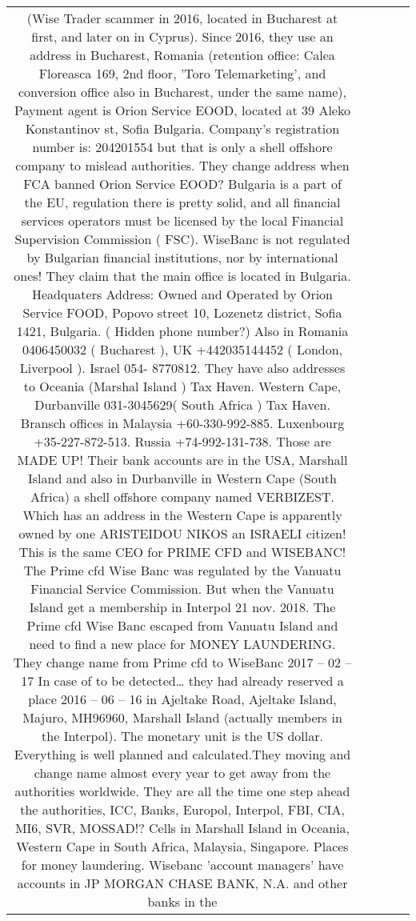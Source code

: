 \documentclass[11pt]{article}
\newlength\mylength
\begin{document}
\begin{center}
\begin{longtable}{|C{.65\mylength}|C{.30\mylength}|C{.12\mylength}|C{.12\mylength}|C{.12\mylength}|}
(Wise Trader scammer in 2016, located in Bucharest at first, and later on in Cyprus). Since 2016,
they use an address in Bucharest, Romania (retention office: Calea Floreasca 169, 2nd floor,
'Toro Telemarketing', and conversion office also in Bucharest, under the same name), Payment
agent is Orion Service EOOD, located at 39 Aleko Konstantinov st, Sofia Bulgaria. Company's
registration number is: 204201554 but that is only a shell offshore company to mislead authorities.
They change address when FCA banned Orion Service EOOD? Bulgaria is a part of the EU,
regulation there is pretty solid, and all financial services operators must be licensed by the local
Financial Supervision Commission ( FSC). WiseBanc is not regulated by Bulgarian financial
institutions, nor by international ones!
They claim that the main office is located in Bulgaria. Headquaters Address: Owned and Operated
by Orion Service FOOD, Popovo street 10, Lozenetz district, Sofia 1421, Bulgaria.
( Hidden phone number?)
Also in Romania 0406450032 ( Bucharest ), UK +442035144452 ( London, Liverpool ). Israel 054-
8770812. They have also addresses to Oceania (Marshal Island ) Tax Haven. Western Cape,
Durbanville 031-3045629( South Africa ) Tax Haven.
Bransch offices in Malaysia +60-330-992-885. Luxenbourg +35-227-872-513.
Russia +74-992-131-738. Those are MADE UP! Their bank accounts are in the USA, Marshall
Island and also in Durbanville in Western Cape (South Africa) a shell offshore company named
VERBIZEST. Which has an address in the Western Cape is apparently owned by one
ARISTEIDOU NIKOS an ISRAELI citizen!
This is the same CEO for PRIME CFD and WISEBANC!
The Prime cfd Wise Banc was regulated by the Vanuatu Financial Service Commission. But when
the Vanuatu Island get a membership in Interpol 21 nov. 2018. The Prime cfd Wise Banc escaped
from Vanuatu Island and need to find a new place for MONEY LAUNDERING. They change name
from Prime cfd to WiseBanc 2017 – 02 – 17 In case of to be detected… they had already reserved a
place 2016 – 06 – 16 in Ajeltake Road, Ajeltake Island, Majuro, MH96960, Marshall Island
(actually members in the Interpol). The monetary unit is the US dollar.
Everything is well planned and calculated.They moving and change name almost every year to get
away from the authorities worldwide. They are all the time one step ahead the authorities, ICC,
Banks, Europol, Interpol, FBI, CIA, MI6, SVR, MOSSAD!? Cells in Marshall Island in Oceania,
Western Cape in South Africa, Malaysia, Singapore. Places for money laundering. Wisebanc
'account managers' have accounts in JP MORGAN CHASE BANK, N.A. and other banks in the

\end{longtable}
\end{center}
\end{document}
